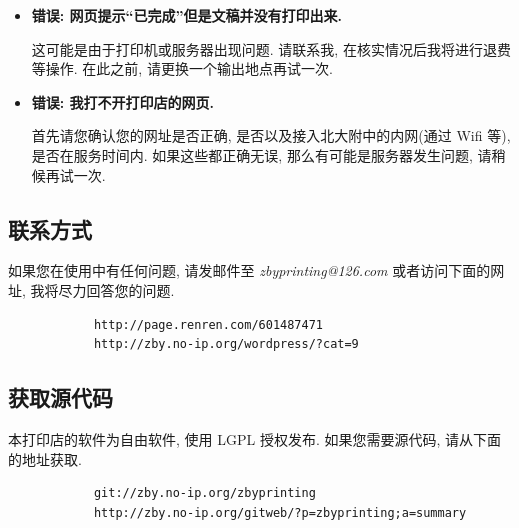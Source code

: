 \documentclass{article}
\begin{document}
\begin{CJK}{UTF8}{gbsn}
\begin{itemize}
{				这是由于您的文档采用的纸张不是标准的 A4 纸. 目前本打印店不提供除 A4 纸以外的纸张. 请调整您的纸张设置, 再试一次.
			}
			\item{\textbf{错误: 网页提示``已完成''但是文稿并没有打印出来.}
			
				这可能是由于打印机或服务器出现问题. 请联系我, 在核实情况后我将进行退费等操作. 在此之前, 请更换一个输出地点再试一次.
			}
			\item{\textbf{错误: 我打不开打印店的网页.}
			
				首先请您确认您的网址是否正确, 是否以及接入北大附中的内网(通过 Wifi 等), 是否在服务时间内. 如果这些都正确无误, 那么有可能是服务器发生问题, 请稍候再试一次.
			}
			
		\end{itemize}
	
	\subsection{联系方式}	
		如果您在使用中有任何问题, 请发邮件至 \textit{zbyprinting@126.com} 或者访问下面的网址, 我将尽力回答您的问题.
		\begin{verbatim}
			http://page.renren.com/601487471
			http://zby.no-ip.org/wordpress/?cat=9
		\end{verbatim}
		
	\subsection{获取源代码}
		本打印店的软件为自由软件, 使用 LGPL 授权发布. 如果您需要源代码, 请从下面的地址获取.
		\begin{verbatim}
			git://zby.no-ip.org/zbyprinting
			http://zby.no-ip.org/gitweb/?p=zbyprinting;a=summary
		\end{verbatim}

\newpage
\end{CJK}
\end{document}
